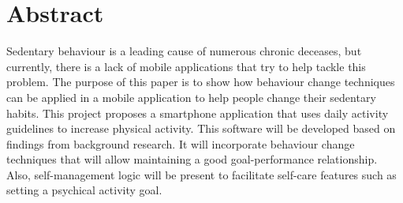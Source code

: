 \chapter{Abstract}
Sedentary behaviour is a leading cause of numerous chronic deceases, but currently, there is a lack of mobile applications that try to help tackle this problem. The purpose of this paper is to show how behaviour change techniques can be applied in a mobile application to help people change their sedentary habits. This project proposes a smartphone application that uses daily activity guidelines to increase physical activity. This software will be developed based on findings from background research. It will incorporate behaviour change techniques that will allow maintaining a good goal-performance relationship. Also, self-management logic will be present to facilitate self-care features such as setting a psychical activity goal.